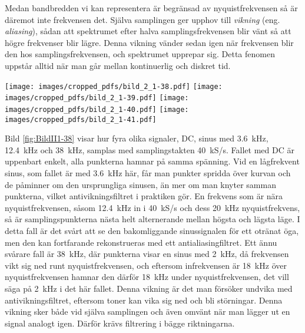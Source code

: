 Medan bandbredden vi kan representera är begränsad av nyquistfrekvensen så
är däremot inte frekvensen det.
Själva samplingen ger upphov till \emph{vikning} (eng. \emph{aliasing}),
sådan att spektrumet efter halva samplingsfrekvensen blir vänt så att högre
frekvenser blir lägre.
Denna vikning vänder sedan igen när frekvensen blir den hos
samplingsfrekvensen, och spektrumet upprepar sig.
Detta fenomen uppstår alltid när man går mellan kontinuerlig och diskret tid.

\begin{figure*}
\begin{center}
\texttt{[image: images/cropped\_pdfs/bild\_2\_1-38.pdf]}
\texttt{[image: images/cropped\_pdfs/bild\_2\_1-39.pdf]}
\texttt{[image: images/cropped\_pdfs/bild\_2\_1-40.pdf]}
\texttt{[image: images/cropped\_pdfs/bild\_2\_1-41.pdf]}
\caption{Sampling av DC, 3,6~kHz, 12,4~kHz och 38~kHz med 40~kS/s samplingstakt}
\label{fig:BildII1-38}
\end{center}
\end{figure*}

Bild \ref{fig:BildII1-38} visar hur fyra olika signaler, DC, sinus med
\SI{3,6}{\kilo\hertz}, \SI{12,4}{\kilo\hertz} och \SI{38}{\kilo\hertz}, samplas
med samplingstakten 40~kS/s.
Fallet med DC är uppenbart enkelt, alla punkterna hamnar på samma spänning.
Vid en lågfrekvent sinus, som fallet är med \SI{3,6}{\kilo\hertz} här, får man
punkter spridda över kurvan och de påminner om den ursprungliga sinusen, än mer
om man knyter samman punkterna, vilket antivikningsfiltret i praktiken gör.
En frekvens som är nära nyquistfrekvensen, såsom \SI{12,4}{\kilo\hertz} in i
40~kS/s och dess \SI{20}{\kilo\hertz} nyquistfrekvens, så är samplingspunkterna
nästa helt alternerande mellan högsta och lägsta läge.
I detta fall är det svårt att se den bakomliggande sinussignalen för ett otränat
öga, men den kan fortfarande rekonstrueras med ett antialiasingfiltret.
Ett ännu svårare fall är \SI{38}{\kilo\hertz}, där punkterna visar en sinus med
\SI{2}{\kilo\hertz}, då frekvensen vikt sig ned runt nyquistfrekvensen, och
eftersom infrekvensen är \SI{18}{\kilo\hertz} över nyquistfrekvensen hamnar den
därför \SI{18}{\kilo\hertz} under nyquistfrekvensen, det vill säga på
\SI{2}{\kilo\hertz} i det här fallet.
Denna vikning är det man försöker undvika med antivikningsfiltret, eftersom
toner kan vika sig ned och bli störningar.
Denna vikning sker både vid själva samplingen och även omvänt när man lägger ut
en signal analogt igen. Därför krävs filtrering i bägge riktningarna.

